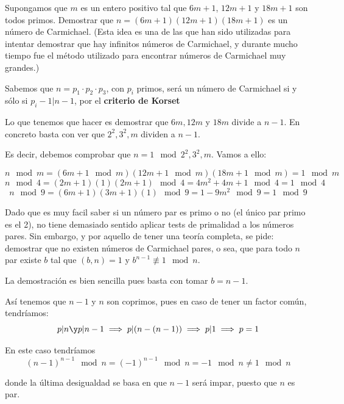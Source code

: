 \begin{problem}[12]
 Supongamos que $m$ es un entero positivo tal que $6m+1$, $12m+1$
y $18m+1$ son todos primos. Demostrar que $n=(6m+1)(12m+1)(18m+1)$
es un número de Carmichael. (Esta idea es una de las que han sido
utilizadas para intentar demostrar que hay infinitos números de
Carmichael, y durante mucho tiempo fue el método utilizado para
encontrar números de Carmichael muy grandes.)
\solution

Sabemos que $n=p_1\cdot p_2\cdot p_3$, con $p_i$ primos, será un número de Carmichael si y sólo si $p_i-1|n-1$, por el \textbf{criterio de Korset}

Lo que tenemos que hacer es demostrar que $6m,12m$ y $18m$ divide a $n-1$. En concreto basta con ver que $2^2,3^2,m$ dividen a $n-1$.

Es decir, debemos comprobar que $n=1 \mod 2^2,3^2,m$. Vamos a ello:

\[n \mod m = (6m+1 \mod m)(12m+1\mod m)(18m +1 \mod m) = 1 \mod m\]
\[n \mod 4 = (2m+1)(1)(2m+1) \mod 4 = 4m^2+4m+1 \mod 4 = 1 \mod 4\]
\[n \mod 9 = (6m +1 )(3m+1) (1) \mod 9 = 1-9m^2 \mod 9 = 1 \mod 9\]


\end{problem}

\begin{problem}[13]
Dado que es muy facil saber si un número par es primo o no (el
único par primo es el 2), no tiene demasiado sentido aplicar tests
de primalidad a los números pares. Sin embargo, y por aquello de
tener una teoría completa, se pide: demostrar que no existen
números de Carmichael pares, o sea, que para todo $n$ par existe
$b$ tal que $(b,n)=1$ y $b^{n-1}\not\equiv 1\mod n$.

\solution


La demostración es bien sencilla pues basta con tomar $b=n-1$.

Así tenemos que $n-1$ y $n$ son coprimos, pues en caso de tener un factor común, tendríamos:
\[p|n \y p|n-1 \implies p|(n-(n-1)) \implies p| 1 \implies p=1\]

En este caso tendríamos
\[(n-1)^{n-1} \mod n = (-1)^{n-1} \mod n = -1 \mod n \neq 1 \mod n\]

donde la última desigualdad se basa en que $n-1$ será impar, puesto que $n$ es par.

\end{problem}

